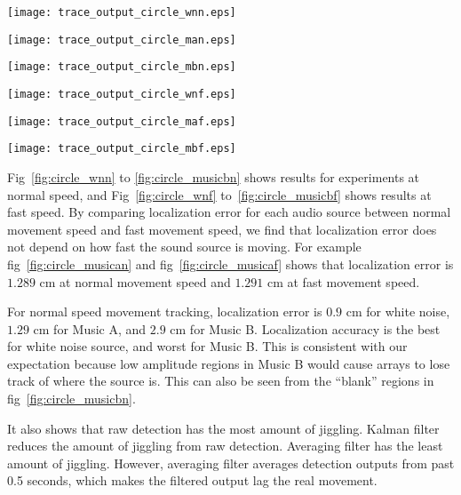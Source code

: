 \begin{figure*}[]
\centering
\texttt{[image: trace\_output\_circle\_wnn.eps]}
\caption{white noise ($10$ cm per second)}
\label{fig:circle_wnn}
\end{figure*}

\begin{figure*}[]
\centering
\texttt{[image: trace\_output\_circle\_man.eps]}
\caption{music A ($10$ cm per second)}
\label{fig:circle_musican}
\end{figure*}

\begin{figure*}[]
\centering
\texttt{[image: trace\_output\_circle\_mbn.eps]}
\caption{music B ($10$ cm per second)}
\label{fig:circle_musicbn}
\end{figure*}

\begin{figure*}[]
\centering
\texttt{[image: trace\_output\_circle\_wnf.eps]}
\caption{white noise ($20$ cm per second)}
\label{fig:circle_wnf}
\end{figure*}

\begin{figure*}[]
\centering
  \texttt{[image: trace\_output\_circle\_maf.eps]}
  \caption{music A ($20$ cm per second)}
  \label{fig:circle_musicaf}
\end{figure*}

\begin{figure*}[]
\centering
  \texttt{[image: trace\_output\_circle\_mbf.eps]}
  \caption{music B ($20$ cm per second)}
  \label{fig:circle_musicbf}
\end{figure*}

Fig~\ref{fig:circle_wnn} to \ref{fig:circle_musicbn} shows results for experiments at normal speed, and Fig~\ref{fig:circle_wnf} to~\ref{fig:circle_musicbf} shows results at fast speed. By comparing localization error for each audio source between normal movement speed and fast movement speed, we find that localization error does not depend on how fast the sound source is moving. For example fig~\ref{fig:circle_musican} and fig~\ref{fig:circle_musicaf} shows that localization error is $1.289$ cm at normal movement speed and $1.291$ cm at fast movement speed.

For normal speed movement tracking, localization error is $0.9$ cm for white noise, $1.29$ cm for Music A, and $2.9$ cm for Music B. Localization accuracy is the best for white noise source, and worst for Music B. This is consistent with our expectation because low amplitude regions in Music B would cause arrays to lose track of where the source is. This can also be seen from the ``blank'' regions in fig~\ref{fig:circle_musicbn}.

It also shows that raw detection has the most amount of jiggling. Kalman filter reduces the amount of jiggling from raw detection. Averaging filter has the least amount of jiggling. However, averaging filter averages detection outputs from past 0.5 seconds, which makes the filtered output lag the real movement. 
